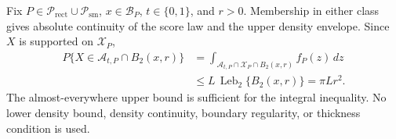 Fix \(P\in\mathcal P_{\mathrm{rect}}\cup\mathcal P_{\mathrm{sm}}\), \(x\in\mathcal B_P\), \(t\in\{0,1\}\), and \(r>0\).  Membership in either class gives absolute continuity of the score law and the upper density envelope.  Since \(X\) is supported on \(\mathcal X_P\),
\[
\begin{aligned}
 P\{X\in\mathcal A_{t,P}\cap B_2(x,r)\}
 &=\int_{\mathcal A_{t,P}\cap\mathcal X_P\cap B_2(x,r)}f_P(z)\,dz\\
 &\leq L\,\operatorname{Leb}_2\{B_2(x,r)\}
 =\pi Lr^2.
\end{aligned}
\]
The almost-everywhere upper bound is sufficient for the integral inequality.  No lower density bound, density continuity, boundary regularity, or thickness condition is used.